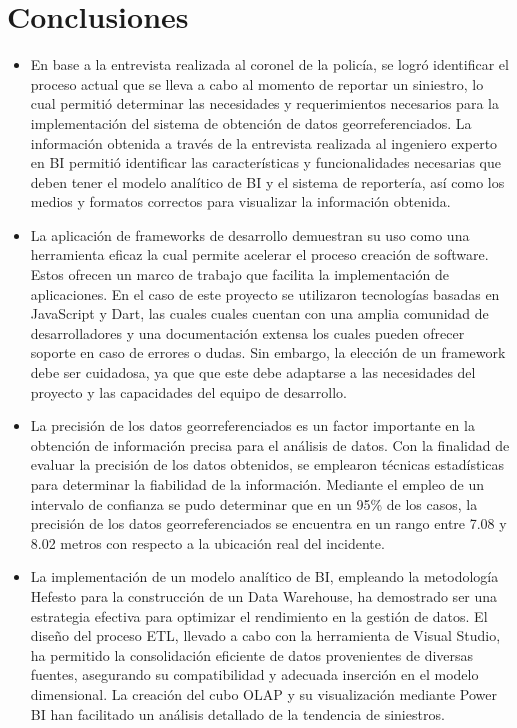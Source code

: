 \section{Conclusiones}
\begin{itemize}
      \item En base a la entrevista realizada al coronel de la policía, se logró identificar el proceso actual que se lleva
            a cabo al momento de reportar un siniestro, lo cual permitió determinar las necesidades y requerimientos necesarios
            para la implementación del sistema de obtención de datos georreferenciados. La información obtenida a través de la
            entrevista realizada al ingeniero experto en BI permitió identificar las características y funcionalidades necesarias
            que deben tener el modelo analítico de BI y el sistema de reportería, así como los medios y formatos correctos para
            visualizar la información obtenida.

      \item La aplicación de frameworks de desarrollo demuestran su uso como una herramienta eficaz la cual permite
            acelerar el proceso creación de software. Estos ofrecen un marco de trabajo que facilita la implementación de
            aplicaciones. En el caso de este proyecto se utilizaron tecnologías basadas en JavaScript y Dart, las cuales
            cuales cuentan con una amplia comunidad de desarrolladores y una documentación extensa los cuales pueden
            ofrecer soporte en caso de errores o dudas. Sin embargo, la elección de un framework debe ser cuidadosa, ya que
            que este debe adaptarse a las necesidades del proyecto y las capacidades del equipo de desarrollo.

      \item La precisión de los datos georreferenciados es un factor importante en la obtención de información precisa
            para el análisis de datos. Con la finalidad de evaluar la precisión de los datos obtenidos, se emplearon técnicas
            estadísticas para determinar la fiabilidad de la información. Mediante el empleo de un intervalo de confianza
            se pudo determinar que en un 95\% de los casos, la precisión de los datos georreferenciados se encuentra en un
            rango entre 7.08 y 8.02 metros con respecto a la ubicación real del incidente.

      \item La implementación de un modelo analítico de BI, empleando la metodología Hefesto para la construcción de un Data
            Warehouse, ha demostrado ser una estrategia efectiva para optimizar el rendimiento en la gestión de datos. El
            diseño del proceso ETL, llevado a cabo con la herramienta de Visual Studio, ha permitido la consolidación
            eficiente de datos provenientes de diversas fuentes, asegurando su compatibilidad y adecuada inserción en el
            modelo dimensional. La creación del cubo OLAP y su visualización mediante Power BI han facilitado un análisis
            detallado de la tendencia de siniestros.


\end{itemize}
